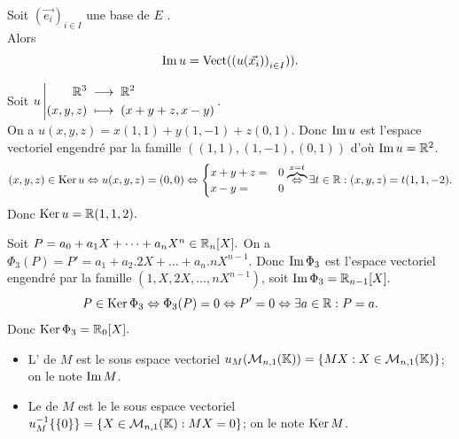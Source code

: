 \documentclass{book}
\begin{document}
\begin{Proposition}
Soit $(\vec{e_i})_{i\in I}$ une base de $E$ .\\
Alors $$ \operatorname{Im} u =\text{Vect}( \left(u(\vec{x_i})\right)_{i\in I})).$$
\end{Proposition}

\begin{Exemple}\label{ex:noyau}
Soit ${u}\left|\begin{aligned}{\mathbb{R}^3}&\;\longrightarrow\;{\mathbb{R}^2}\\{(x,y,z)}&\;\longmapsto\;{(x+y+z,x-y)}\end{aligned}\right.$.\\
On a $u(x,y,z)=x(1,1)+y(1,-1)+z(0,1)$.
Donc $\operatorname{Im} u$ est l'espace vectoriel engendré par la famille $((1,1),(1,-1),(0,1))$ d'où $\operatorname{Im} u=\mathbb{R}^2$.
$$(x,y,z)\in \operatorname{Ker} u \Leftrightarrow u(x,y,z)=(0,0)  \Leftrightarrow \begin{cases}x+y+z=&0\\x-y=&0\end{cases}\overbrace{\Leftrightarrow}^{x=t} \exists t \in \mathbb{R}: (x,y,z)=t(1,1,-2).$$
Donc $\operatorname{Ker} u =\mathbb{R} (1,1,2).$
\end{Exemple}
\begin{Exemple}
Soit $P=a_0+a_1 X+\dots + a_n X^n \in \mathbb{R}_n[X].$
On a $\Phi_3(P)=P'=a_1+a_2 .2X+\dots  + a_n.nX^{n-1}$.
Donc $\operatorname{Im} \Phi_3$ est l'espace vectoriel engendré par la famille $(1,X,2X,\dots,nX^{n-1})$, soit $\operatorname{Im} \Phi_3=\mathbb{R}_{n-1}[X].$
 $$P\in \operatorname{Ker} \Phi_3  \Leftrightarrow \Phi_3(P)=0  \Leftrightarrow P'=0\Leftrightarrow \exists a\in \mathbb{R} : P=a.$$
Donc $\operatorname{Ker} \Phi_3 =\mathbb{R}_{0}[X].$
\end{Exemple}
\begin{Definition}
\begin{itemize}
\item
  L' de $M$ est le sous espace vectoriel $u_M(\mathcal{M}_{n,1}(\mathbb{K})) = \{MX:X\in \mathcal{M}_{n,1}(\mathbb{K})\}$;
  on le note $\operatorname{Im} M$.
\item
  Le  de $M$ est le le sous espace vectoriel $u_M^{-1}\{ \{0 \}\} = \{X\in  \mathcal{M}_{n,1}(\mathbb{K}):MX=0\}$;
  on le note $\operatorname{Ker} M$.
\end{itemize}
\end{Definition}
\end{document}
